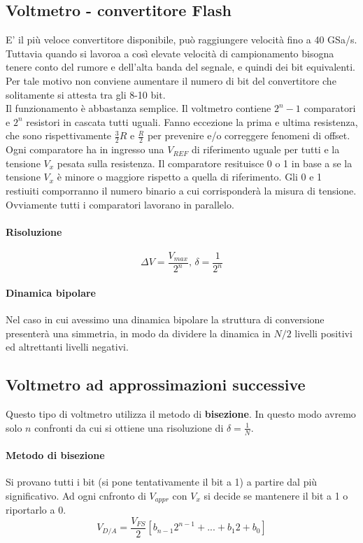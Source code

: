 \documentclass{article}
\begin{document}
	\subsection*{Voltmetro - convertitore Flash}
	E' il più veloce convertitore disponibile, può raggiungere velocità fino a 40 GSa/s. Tuttavia quando si lavoroa a così elevate velocità di campionamento bisogna tenere conto del rumore e dell'alta banda del segnale, e quindi dei bit equivalenti. Per tale motivo non conviene aumentare il numero di bit del convertitore che solitamente si attesta tra gli 8-10 bit.\\
	Il funzionamento è abbastanza semplice. Il voltmetro contiene $2^n - 1$ comparatori e $2^n$ resistori in cascata tutti uguali. Fanno eccezione la prima e ultima resistenza, che sono rispettivamente $\frac{3}{2}R$ e $\frac{R}{2}$ per prevenire e/o correggere fenomeni di offset. Ogni comparatore ha in ingresso una $V_{REF}$ di riferimento uguale per tutti e la tensione $V_x$ pesata sulla resistenza. Il comparatore resituisce 0 o 1 in base a se la tensione $V_x$ è minore o maggiore rispetto a quella di riferimento. Gli 0 e 1 restiuiti comporranno il numero binario a cui corrisponderà la misura di tensione. Ovviamente tutti i comparatori lavorano in parallelo.
	\paragraph*{Risoluzione}
	\begin{equation}
		\Delta V = \frac{V_{max}}{2^n} \text{,   } \delta = \frac{1}{2^n}
	\end{equation}
	\paragraph*{Dinamica bipolare}
	Nel caso in cui avessimo una dinamica bipolare la struttura di conversione presenterà una simmetria, in modo da dividere la dinamica in $N/2$ livelli positivi ed altrettanti livelli negativi.
	\subsection*{Voltmetro ad approssimazioni successive}
	Questo tipo di voltmetro utilizza il metodo di \textbf{bisezione}. In questo modo avremo solo $n$ confronti da cui si ottiene una risoluzione di $\delta = \frac{1}{N}$.
	\paragraph*{Metodo di bisezione}
	Si provano tutti i bit (si pone tentativamente il bit a 1) a partire dal più significativo. Ad ogni cnfronto di $V_{appr}$ con $V_x$ si decide se mantenere il bit a 1 o riportarlo a 0.
	\begin{equation}
		V_{D/A} = \frac{V_{FS}}{2}\left[ b_{n-1}2^{n-1} + ... + b_1 2 + b_0 \right]
	\end{equation}
\end{document}
